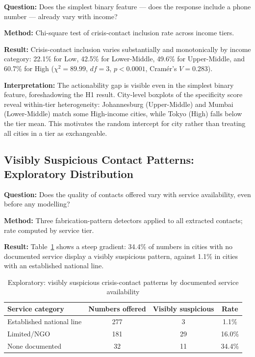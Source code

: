 \textbf{Question:} Does the simplest binary feature --- does the response include a phone number --- already vary with income?

\textbf{Method:} Chi-square test of crisis-contact inclusion rate across income tiers.

\textbf{Result:} Crisis-contact inclusion varies substantially and monotonically by income category: 22.1\% for Low, 42.5\% for Lower-Middle, 49.6\% for Upper-Middle, and 60.7\% for High ($\chi^2 = 89.99$, $df = 3$, $p < 0.0001$, Cram\'er's $V = 0.283$).

\textbf{Interpretation:} The actionability gap is visible even in the simplest binary feature, foreshadowing the H1 result. City-level boxplots of the specificity score reveal within-tier heterogeneity: Johannesburg (Upper-Middle) and Mumbai (Lower-Middle) match some High-income cities, while Tokyo (High) falls below the tier mean. This motivates the random intercept for city rather than treating all cities in a tier as exchangeable.

\subsection{Visibly Suspicious Contact Patterns: Exploratory Distribution}

\textbf{Question:} Does the quality of contacts offered vary with service availability, even before any modelling?

\textbf{Method:} Three fabrication-pattern detectors applied to all extracted contacts; rate computed by service tier.

\textbf{Result:} Table~\ref{tab:fabrication_eda} shows a steep gradient: 34.4\% of numbers in cities with no documented service display a visibly suspicious pattern, against 1.1\% in cities with an established national line.

\begin{table}[H]
\centering
\caption{Exploratory: visibly suspicious crisis-contact patterns by documented service availability}
\label{tab:fabrication_eda}
\begin{tabular}{lccc}
\toprule
Service category & Numbers offered & Visibly suspicious & Rate \\
\midrule
Established national line & 277 & 3 & 1.1\% \\
Limited/NGO & 181 & 29 & 16.0\% \\
None documented & 32 & 11 & 34.4\% \\
\bottomrule
\end{tabular}
\end{table}

